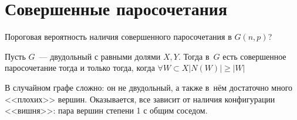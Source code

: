 \documentclass{article}
\begin{document}
\section{Совершенные паросочетания}

Пороговая вероятность наличия совершенного паросочетания в $G(n, p)$?

\begin{theorem}[Холл]
	Пусть $G$~--- двудольный с равными долями $X, Y$. Тогда в~$G$ есть совершенное паросочетание тогда
	и только тогда, когда $\forall W \subset X |N(W)| \ge |W|$
\end{theorem}

В случайном графе сложно: он не двудольный, а также в~нём достаточно много <<плохих>> вершин.
Оказывается, все зависит от наличия конфигурации <<вишня>>: пара вершин степени 1 с общим соседом.
\end{document}
